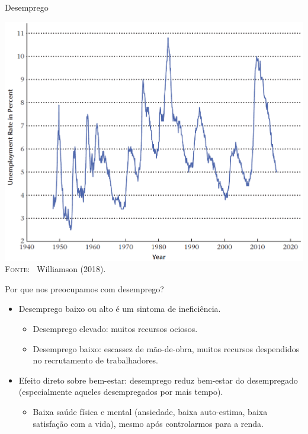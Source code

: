 \documentclass[10pt]{beamer}
\begin{document}
\begin{frame}{Desemprego}
    \begin{center}
        \begin{minipage}[b]{.57\textwidth}
            \includegraphics[width=\textwidth]{./figures/unemployment.PNG}
            \tiny{{\scshape Fonte}: \ Williamson (2018).}
        \end{minipage}
    \end{center}
\end{frame}

\begin{frame}{Por que nos preocupamos com desemprego?}
    \begin{itemize}
        \item Desemprego baixo ou alto é um sintoma de ineficiência.\medskip
        \begin{itemize}
            \item Desemprego elevado: muitos recursos ociosos.\medskip
            \item Desemprego baixo: escassez de mão-de-obra, muitos recursos despendidos no recrutamento de trabalhadores.\bigskip
        \end{itemize}
        \item Efeito direto sobre bem-estar: desemprego reduz bem-estar do desempregado (especialmente aqueles desempregados por mais tempo).\medskip
        \begin{itemize}
            \item Baixa saúde física e mental (ansiedade, baixa auto-estima, baixa satisfação com a vida), mesmo após controlarmos para a renda.
        \end{itemize}
    \end{itemize}
\end{frame}
\end{document}
